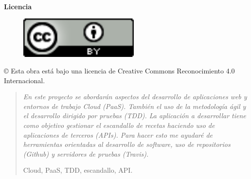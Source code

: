 \documentclass[spanish,a4paper,twoside]{report}
\newenvironment{palabrasClave}
{\begin{list}{}{\setlength{\leftmargin}{1em}}\item[\hskip\labelsep \bfseries Palabras clave:]}
{\end{list}}
\begin{document}
\newpage
{
\begin{center}
  \textbf{{\huge Licencia}}

  \vspace*{0.2in}
  \begin{figure}[htb]
    \begin{center}
      \includegraphics[width=6cm]{./images/logotipo-licencia.png}
    \end{center}
  \end{figure}
  
  \vspace*{0.2in}
  \begin{Large}
    © Esta obra está bajo una licencia de Creative Commons Reconocimiento 4.0 Internacional.
  \end{Large}
\end{center}
}


\newpage
\begin{abstract}
{\em 
En este proyecto se abordarán aspectos del desarrollo de aplicaciones web y entornos de trabajo Cloud (PaaS). También el uso de la metodología ágil y el desarrollo dirigido por pruebas (TDD). La aplicación a desarrollar tiene como objetivo gestionar el escandallo de recetas haciendo uso de aplicaciones de terceros (APIs). Para hacer esto me ayudaré de herramientas orientadas al desarrollo de software, uso de repositorios (Github) y servidores de pruebas (Travis).
}

\vspace*{0.2in}
\begin{palabrasClave}
  Cloud, PaaS, TDD, escandallo, API.
\end{palabrasClave}

\end{abstract}
\end{document}

